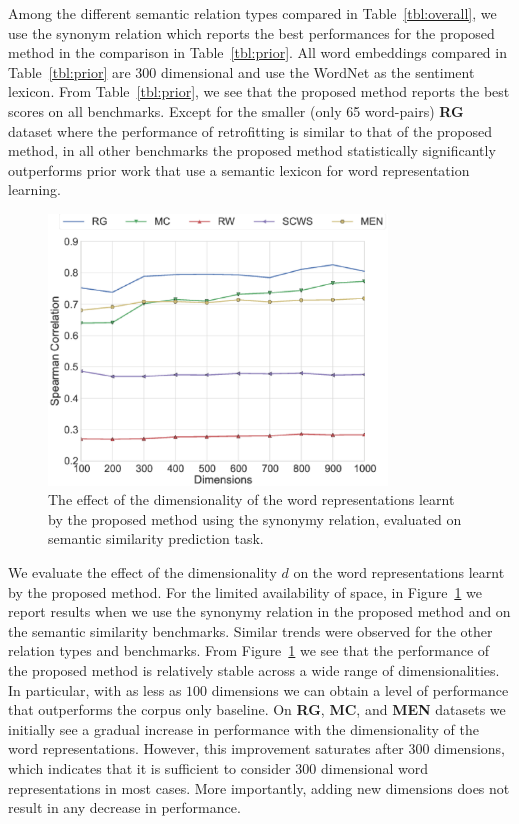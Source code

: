 \documentclass[letterpaper]{article}
\begin{document}
Among the different semantic relation types compared in Table~\ref{tbl:overall}, we use the synonym relation which reports
the best performances for the proposed method in the comparison in Table~\ref{tbl:prior}.
All word embeddings compared in Table~\ref{tbl:prior} are $300$ dimensional and use the WordNet as the sentiment lexicon.
From Table~\ref{tbl:prior}, we see that the proposed method reports the best scores on all benchmarks.
Except for the smaller (only 65 word-pairs) \textbf{RG} dataset where the performance of  retrofitting is similar to that of the proposed method,
in all other benchmarks the proposed method statistically significantly outperforms prior work that use a semantic lexicon
for word representation learning.

\begin{figure}[t]
\centering
\includegraphics[width=90mm]{dims.eps}
\caption{The effect of the dimensionality of the word representations learnt by the proposed method using
the synonymy relation, evaluated on semantic similarity prediction task.}
\label{fig:dims}
\end{figure}


We evaluate the effect of the dimensionality $d$ on the word representations learnt by the proposed method.
For the limited availability of space, in Figure~\ref{fig:dims}
we report results when we use the synonymy relation in the proposed method and on the semantic similarity benchmarks.
Similar trends were observed for the other relation types and benchmarks.
From Figure~\ref{fig:dims} we see that the performance of the proposed method is relatively stable across a wide range of
dimensionalities. In particular, with as less as $100$ dimensions we can obtain a level of performance that outperforms the
corpus only baseline.
On \textbf{RG}, \textbf{MC}, and \textbf{MEN} datasets we initially see a gradual increase in performance with the dimensionality of
the word representations. However, this improvement saturates after $300$ dimensions, which indicates that it is sufficient to
consider $300$ dimensional word representations in most cases. More importantly, adding new dimensions does not result in
any decrease in performance.
\end{document}

